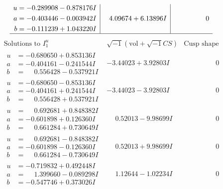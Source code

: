\documentclass[1p]{elsarticle_modified}
\theoremstyle{definition}
\newcommand{\I}{\sqrt{-1}}
\begin{document}
$$\begin{array}{c|c|c}
\begin{aligned}
u &= -0.289908 - 0.878176 I \\
a &= -0.403446 - 0.003942 I \\
b &= -0.111239 + 1.043220 I\end{aligned}
 & \phantom{-}4.09674 + 6.13896 I & \phantom{-0.000000 } 0\\
 \hline 
 \end{array}$$\newpage$$\begin{array}{c|c|c}  
\text{Solutions to }I^u_{1}& \I (\text{vol} + \sqrt{-1}CS) & \text{Cusp shape}\\
 \hline 
\begin{aligned}
u &= -0.680650 + 0.853136 I \\
a &= -0.404161 - 0.241544 I \\
b &= \phantom{-}0.556428 - 0.537921 I\end{aligned}
 & -3.44023 + 3.92803 I & \phantom{-0.000000 } 0 \\ \hline\begin{aligned}
u &= -0.680650 - 0.853136 I \\
a &= -0.404161 + 0.241544 I \\
b &= \phantom{-}0.556428 + 0.537921 I\end{aligned}
 & -3.44023 - 3.92803 I & \phantom{-0.000000 } 0 \\ \hline\begin{aligned}
u &= \phantom{-}0.692681 + 0.848382 I \\
a &= -0.601898 + 0.126360 I \\
b &= \phantom{-}0.661284 + 0.730649 I\end{aligned}
 & \phantom{-}0.52013 - 9.98699 I & \phantom{-0.000000 } 0 \\ \hline\begin{aligned}
u &= \phantom{-}0.692681 - 0.848382 I \\
a &= -0.601898 - 0.126360 I \\
b &= \phantom{-}0.661284 - 0.730649 I\end{aligned}
 & \phantom{-}0.52013 + 9.98699 I & \phantom{-0.000000 } 0 \\ \hline\begin{aligned}
u &= -0.719832 + 0.492448 I \\
a &= \phantom{-}1.399660 - 0.089298 I \\
b &= -0.547746 + 0.373026 I\end{aligned}
 & \phantom{-}1.12644 - 1.02234 I & \phantom{-0.000000 } 0 \\ \hline\begin{aligned}

\end{aligned}
\end{array}$$
\end{document}

